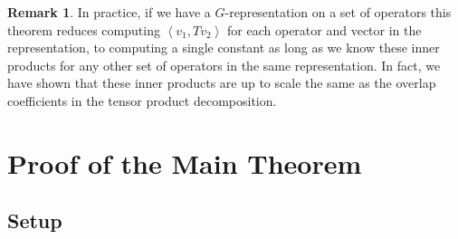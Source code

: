 \documentclass[12pt]{extarticle}
\theoremstyle{definition}
\newtheorem{remark}{Remark}
\newcommand{\inner}[2]{\left< #1, #2 \right>}
\begin{document}
\begin{remark}
In practice, if we have a $G$-representation on a set of operators this theorem reduces computing $\inner{v_1}{T v_2}$ for each operator and vector in the representation, to computing a single constant as long as we know these inner products for any other set of operators in the same representation. In fact, we have shown that these inner products are up to scale the same as the overlap coefficients in the tensor product decomposition.
\end{remark}

\section{Proof of the Main Theorem}

\subsection{Setup}

\newcommand{\ph}{\hat{\phi}}
\newcommand{\phd}{\hat{\phi}^\dagger}
\newcommand{\Hilbert}{\mathcal{H}}
\newcommand{\Spin}[1]{\mathrm{Spin}\left( #1 \right)}
\newcommand{\ket}[1]{\left| #1 \right>}
\newcommand{\bra}[1]{\left< #1 \right|}
\end{document}
